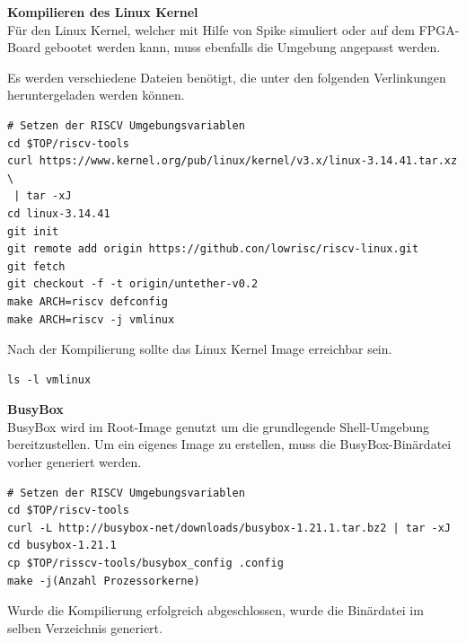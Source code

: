 \vspace{5mm}

 \textbf{Kompilieren des Linux Kernel}\\

Für den Linux Kernel, welcher mit Hilfe von Spike simuliert oder auf dem FPGA-Board gebootet werden kann, muss ebenfalls die Umgebung angepasst werden.

Es werden verschiedene Dateien benötigt, die unter den folgenden Verlinkungen heruntergeladen werden können.\\

\begin{lstlisting}[caption={Download und Anpassung des Kernels},label={code:kernelkonf}]
# Setzen der RISCV Umgebungsvariablen
cd $TOP/riscv-tools
curl https://www.kernel.org/pub/linux/kernel/v3.x/linux-3.14.41.tar.xz \
 | tar -xJ
cd linux-3.14.41
git init
git remote add origin https://github.con/lowrisc/riscv-linux.git
git fetch
git checkout -f -t origin/untether-v0.2
make ARCH=riscv defconfig
make ARCH=riscv -j vmlinux
\end{lstlisting}

\vspace{10mm}

Nach der Kompilierung sollte das Linux Kernel Image erreichbar sein.\\

\begin{lstlisting}[caption={Erreichbarkeit des Kernel-Images},label={code:kernelimage}]
ls -l vmlinux
\end{lstlisting}

\newpage
\textbf{BusyBox}\\

BusyBox wird im Root-Image genutzt um die grundlegende Shell-Umgebung bereitzustellen. Um ein eigenes Image zu erstellen, muss die BusyBox-Binärdatei vorher generiert werden.\\

\begin{lstlisting}[caption={Download der BusyBox},label={code:dowbusybox},extendedchars=false]
# Setzen der RISCV Umgebungsvariablen
cd $TOP/riscv-tools
curl -L http://busybox-net/downloads/busybox-1.21.1.tar.bz2 | tar -xJ
cd busybox-1.21.1
cp $TOP/risscv-tools/busybox_config .config
make -j(Anzahl Prozessorkerne)
\end{lstlisting}


Wurde die Kompilierung erfolgreich abgeschlossen, wurde die Binärdatei im selben Verzeichnis generiert.\\

